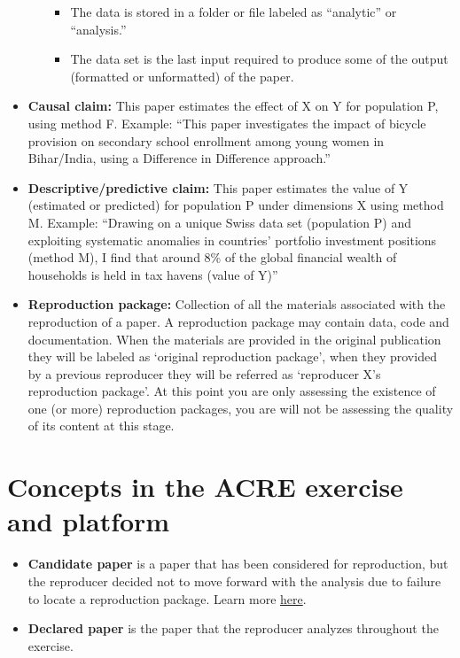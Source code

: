 \documentclass[]{book}
\providecommand{\tightlist}{%
  \setlength{\itemsep}{0pt}\setlength{\parskip}{0pt}}
\begin{document}
\begin{itemize}
\begin{itemize}
    \begin{itemize}
    \tightlist
    \item
      The data is stored in a folder or file labeled as ``analytic'' or ``analysis.''
    \item
      The data set is the last input required to produce some of the output (formatted or unformatted) of the paper.
    \end{itemize}
  \end{itemize}
\item
  \textbf{Causal claim:} This paper estimates the effect of X on Y for population P, using method F. Example: ``This paper investigates the impact of bicycle provision on secondary school enrollment among young women in Bihar/India, using a Difference in Difference approach.''
\item
  \textbf{Descriptive/predictive claim:} This paper estimates the value of Y (estimated or predicted) for population P under dimensions X using method M. Example: ``Drawing on a unique Swiss data set (population P) and exploiting systematic anomalies in countries' portfolio investment positions (method M), I find that around 8\% of the global financial wealth of households is held in tax havens (value of Y)''
\item
  \textbf{Reproduction package:} Collection of all the materials associated with the reproduction of a paper. A reproduction package may contain data, code and documentation. When the materials are provided in the original publication they will be labeled as `original reproduction package', when they provided by a previous reproducer they will be referred as `reproducer X's reproduction package'. At this point you are only assessing the existence of one (or more) reproduction packages, you are will not be assessing the quality of its content at this stage.
\end{itemize}

\hypertarget{concepts-in-the-acre-exercise-and-platform}{%
\section{Concepts in the ACRE exercise and platform}\label{concepts-in-the-acre-exercise-and-platform}}

\begin{itemize}
\tightlist
\item
  \textbf{Candidate paper} is a paper that has been considered for reproduction, but the reproducer decided not to move forward with the analysis due to failure to locate a reproduction package. Learn more \href{https://bitss.github.io/ACRE/scoping.html\#from-candidate-to-declared-paper}{here}.
\item
  \textbf{Declared paper} is the paper that the reproducer analyzes throughout the exercise.
\end{itemize}


\end{document}
